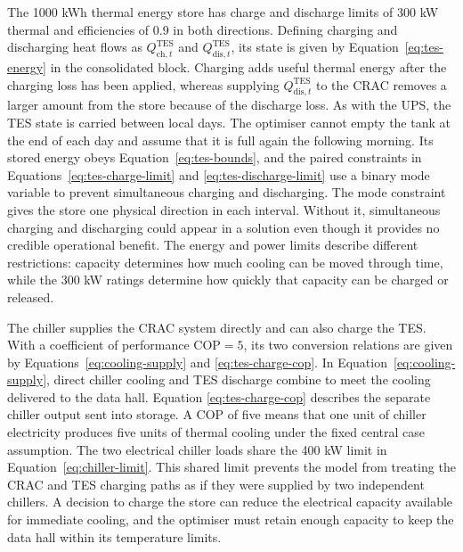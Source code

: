 The 1000 kWh thermal energy store has charge and discharge limits of 300 kW
thermal and efficiencies of 0.9 in both directions. Defining charging and
discharging heat flows as $Q^{\mathrm{TES}}_{\mathrm{ch},t}$ and
$Q^{\mathrm{TES}}_{\mathrm{dis},t}$, its state is given by
Equation~\eqref{eq:tes-energy} in the consolidated block.
Charging adds useful thermal energy after the charging loss has been applied,
whereas supplying $Q^{\mathrm{TES}}_{\mathrm{dis},t}$ to the CRAC removes a larger
amount from the store because of the discharge loss. As with the UPS, the TES
state is carried between local days. The optimiser cannot empty the tank at the
end of each day and assume that it is full again the following morning.
Its stored energy obeys Equation~\eqref{eq:tes-bounds}, and the paired constraints
in Equations~\eqref{eq:tes-charge-limit} and \eqref{eq:tes-discharge-limit} use a
binary mode variable to prevent simultaneous charging and discharging.
The mode constraint gives the store one physical direction in each interval.
Without it, simultaneous charging and discharging could appear in a solution
even though it provides no credible operational benefit. The energy and power
limits describe different restrictions: capacity determines how much cooling
can be moved through time, while the 300 kW ratings determine how quickly that
capacity can be charged or released.

The chiller supplies the CRAC system directly and can also charge the TES. With
a coefficient of performance $\mathrm{COP}=5$, its two conversion relations are
given by Equations~\eqref{eq:cooling-supply} and \eqref{eq:tes-charge-cop}.
In Equation~\eqref{eq:cooling-supply}, direct chiller cooling and TES discharge
combine to meet the cooling delivered to the data hall. Equation
\eqref{eq:tes-charge-cop} describes the separate chiller output sent into
storage. A COP of five means that one unit of chiller electricity produces five
units of thermal cooling under the fixed central case assumption.
The two electrical chiller loads share the 400 kW limit in
Equation~\eqref{eq:chiller-limit}.
This shared limit prevents the model from treating the CRAC and TES charging
paths as if they were supplied by two independent chillers. A decision to charge
the store can reduce the electrical capacity available for immediate
cooling, and the optimiser must retain enough capacity to keep the data hall
within its temperature limits.

